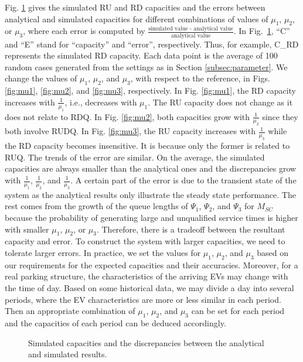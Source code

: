 \documentclass[journal]{IEEEtran}
\begin{document}
Fig. \ref{fig:scm_all} gives the simulated RU and RD capacities and the errors between analytical and simulated capacities for different combinations of values of $\mu_1$, $\mu_2$, or $\mu_3$, where each error is computed by $\frac{\text{simulated value - analytical value}}{\text{analytical value}}$.
In Fig.~\ref{fig:scm_all}, ``C'' and ``E'' stand for ``capacity'' and ``error'', respectively. Thus, for example, C\_RD represents the simulated RD capacity. Each data point is the average of 100 random cases generated from the settings as in Section \ref{subsec:parameter}. We change the values of $\mu_1$, $\mu_2$, and $\mu_3$, with respect to the reference, in Figs. \ref{fig:mu1}, \ref{fig:mu2}, and \ref{fig:mu3}, respectively. 
In Fig. \ref{fig:mu1}, the RD capacity increases with $\frac{1}{\mu_1}$, i.e., decreases with $\mu_1$. The RU capacity does not change as it does not relate to RDQ. In Fig. \ref{fig:mu2}, both capacities grow with $\frac{1}{\mu_2}$ since they both involve RUDQ. In Fig. \ref{fig:mu3}, the RU capacity increases with $\frac{1}{\mu_3}$ while the RD capacity becomes insensitive. It is because only the former is related to RUQ.
The trends of the error are similar. On the average, the simulated capacities are always smaller than the analytical ones and the discrepancies grow with $\frac{1}{\mu_1}$, $\frac{1}{\mu_2}$, and $\frac{1}{\mu_3}$. 
A certain part of the error is due to the transient state of the system as the analytical results only illustrate the steady state performance.
The rest comes from the growth of the queue lengths of $\Psi_1$, $\Psi_2$, and $\Psi_3$ for $M_{SC}$ because the probability of generating large and unqualified service times is higher with smaller $\mu_1$, $\mu_2$, or $\mu_3$. 
Therefore, there is a tradeoff between the resultant capacity and error. To construct the system with larger capacities, we need to tolerate larger errors. In practice, we set the values for $\mu_1$, $\mu_2$, and $\mu_3$ based on our requirements for the expected capacities and their accuracies.
Moreover, for a real parking structure, the characteristics of the arriving EVs may change with the time of day. Based on some historical data, we may divide a day into several periods, where the EV characteristics are more or less similar in each period. Then an appropriate combination of $\mu_1$, $\mu_2$, and $\mu_3$ can be set for each period and the capacities of each period can be deduced accordingly.

\begin{figure}[!t]
	\begin{center}
	\end{center}
	\caption{Simulated capacities and the discrepancies between the analytical and simulated results.}
  \label{fig:scm_all}
\end{figure}
\end{document}
